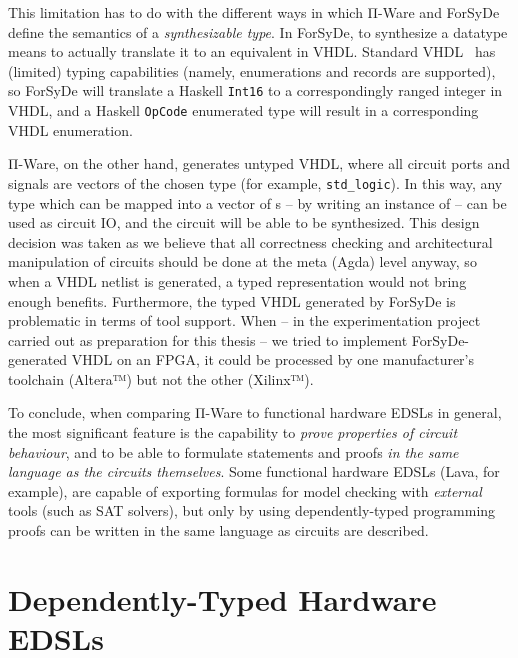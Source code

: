         This limitation has to do with the different ways in which Π-Ware and ForSyDe define
        the semantics of a \emph{synthesizable type}.
        In ForSyDe, to synthesize a datatype means to actually translate it to an equivalent in \ac{VHDL}.
        Standard \ac{VHDL}~\cite{vhdl-standard} has (limited) typing capabilities
        (namely, enumerations and records are supported), so ForSyDe will translate
        a Haskell \texttt{Int16} to a correspondingly ranged integer in VHDL,
        and a Haskell \texttt{OpCode} enumerated type will result in a corresponding
        \ac{VHDL} enumeration.

        Π-Ware, on the other hand, generates untyped \ac{VHDL}, where all circuit ports and signals
        are vectors of the chosen  type (for example, \texttt{std_logic}).
        In this way, any type which can be mapped into a vector of s – by writing an
        instance of  – can be used as circuit IO, and the circuit will be able to be synthesized.
        This design decision was taken as we believe that all correctness checking and architectural
        manipulation of circuits should be done at the meta (Agda) level anyway,
        so when a \ac{VHDL} netlist is generated, a typed representation would not bring enough benefits.
        Furthermore, the typed \ac{VHDL} generated by ForSyDe is problematic in terms of tool support.
        When – in the experimentation project~\cite{functional-hardware-survey} carried out as preparation
        for this thesis – we tried to implement ForSyDe-generated \ac{VHDL} on an \ac{FPGA},
        it could be processed by one manufacturer's toolchain (Altera™) but not the other (Xilinx™).

        To conclude, when comparing Π-Ware to functional hardware \acp{EDSL} in general,
        the most significant feature is the capability to \emph{prove properties of circuit behaviour},
        and to be able to formulate statements and proofs
        \emph{in the same language as the circuits themselves}.
        Some functional hardware \acp{EDSL} (Lava, for example), are capable of exporting formulas
        for model checking with \emph{external} tools (such as SAT solvers), but only by using
        dependently-typed programming proofs can be written in the same language as circuits are described.



    \section{Dependently-Typed Hardware \acp{EDSL}}

